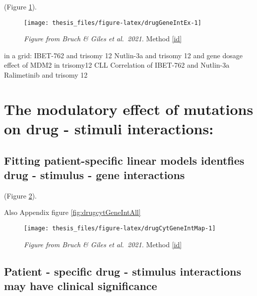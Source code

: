 \documentclass[11pt, a4paper, twosided]{book}
\begin{document}
(Figure \ref{fig:drugGeneIntEx}).


\begin{figure}

{\centering \texttt{[image: thesis\_files/figure-latex/drugGeneIntEx-1]} 

}

\caption{\emph{Figure from Bruch \& Giles et al.~2021.} Method \ref{id}}\label{fig:drugGeneIntEx}
\end{figure}
in a grid:
IBET-762 and trisomy 12
Nutlin-3a and trisomy 12 and gene dosage effect of MDM2 in trisomy12 CLL
Correlation of IBET-762 and Nutlin-3a
Ralimetinib and trisomy 12

\hypertarget{the-modulatory-effect-of-mutations-on-drug---stimuli-interactions}{%
\section{The modulatory effect of mutations on drug - stimuli interactions:}\label{the-modulatory-effect-of-mutations-on-drug---stimuli-interactions}}

\hypertarget{fitting-patient-specific-linear-models-identfies-drug---stimulus---gene-interactions}{%
\subsection{Fitting patient-specific linear models identfies drug - stimulus - gene interactions}\label{fitting-patient-specific-linear-models-identfies-drug---stimulus---gene-interactions}}

(Figure \ref{fig:drugCytGeneIntMap}).

Also Appendix figure \ref{fig:drugcytGeneIntAll}


\begin{figure}

{\centering \texttt{[image: thesis\_files/figure-latex/drugCytGeneIntMap-1]} 

}

\caption{\emph{Figure from Bruch \& Giles et al.~2021.} Method \ref{id}}\label{fig:drugCytGeneIntMap}
\end{figure}
\hypertarget{patient---specific-drug---stimulus-interactions-may-have-clinical-significance}{%
\subsection{Patient - specific drug - stimulus interactions may have clinical significance}\label{patient---specific-drug---stimulus-interactions-may-have-clinical-significance}}
\end{document}
